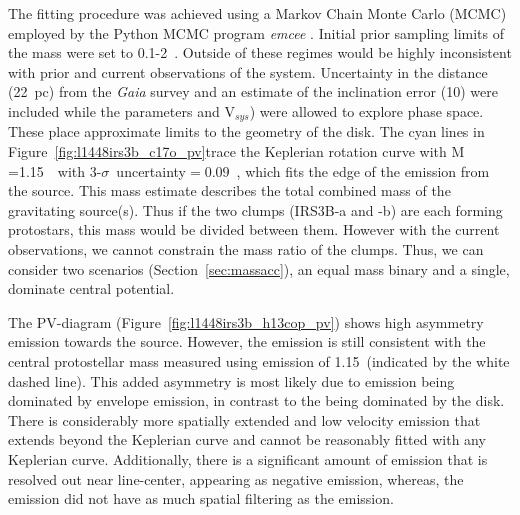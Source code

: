 \documentclass[twocolumn, 12pt, trackchanges]{aastex63}
\begin{document}
The fitting procedure was achieved using a Markov Chain Monte Carlo (MCMC) employed by the Python MCMC program  \textit{emcee} \citep{2013PASP..125..306F}. Initial prior sampling limits of the mass were set to 0.1-2~\solm. Outside of these regimes would be highly inconsistent with prior and current observations of the system. Uncertainty in the distance (22~pc) from the \textit{Gaia} survey \citep[][]{2018arXiv180803499O} and an estimate of the inclination error (10\deg) were included while the parameters  and V$_{sys}$) were allowed to explore phase space. These place approximate limits to the geometry of the disk. The cyan lines in Figure~\ref{fig:l1448irs3b_c17o_pv}\space trace the Keplerian rotation curve with M$_{\*}$=1.15~\solm~with 3-$\sigma$~uncertainty$=0.09$~\solm, which fits the edge of the \cso\space emission from the source. This mass estimate describes the total combined mass of the gravitating source(s). Thus if the two clumps (IRS3B-a and -b) are each forming protostars, this mass would be divided between them. However with the current observations, we cannot constrain the mass ratio of the clumps. Thus, we can consider two scenarios (Section~\ref{sec:massacc}), an equal mass binary and a single, dominate central potential.

The \htcop\space PV-diagram (Figure~\ref{fig:l1448irs3b_h13cop_pv}) shows high asymmetry emission towards the source. However, the \htcop\space emission is still consistent with the central protostellar mass measured using \cso\space emission of 1.15~\solm\space(indicated by the white dashed line). This added asymmetry is most likely due to \htcop\space emission being dominated by envelope emission, in contrast to the \cso\space being dominated by the disk. There is considerably more spatially extended and low velocity emission that extends beyond the Keplerian curve and cannot be reasonably fitted with any Keplerian curve. Additionally, there is a significant amount of \htcop\space emission that is resolved out near line-center, appearing as negative emission, whereas, the \cso\space emission did not have as much spatial filtering as the \htcop\space emission.
\end{document}
